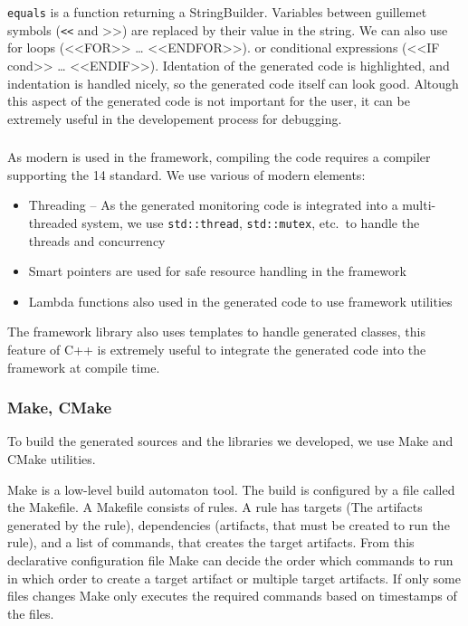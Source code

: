 \texttt{equals} is a function returning a StringBuilder.
Variables between guillemet symbols (\texttt{<<} and >>) are replaced by their value in the string. 
We can also use for loops (<<FOR>> \dots{} <<ENDFOR>>). or conditional expressions (<<IF cond>> \dots{} <<ENDIF>>).
Identation of the generated code is highlighted, and indentation is handled nicely, so the generated code itself can look good. 
Altough this aspect of the generated code is not important for the user, it can be extremely useful in the developement process for debugging. 




\subsubsection{\protect\cpptt }

As modern \cpp{} is used in the framework, compiling the code requires a compiler supporting the \cpp{}14 standard.
We use various of modern \cpp{} elements:
\begin{itemize}
	\item Threading -- As the generated monitoring code is integrated into a multi-threaded system, we use \texttt{std::thread}, \texttt{std::mutex}, etc.\ to handle the threads and concurrency
	\item Smart pointers are used for safe resource handling in the framework
	\item Lambda functions also used in the generated code to use framework utilities
\end{itemize}
The framework library also uses \cpp{} templates to handle generated classes, this feature of C++ is extremely useful to integrate the generated code into the framework at compile time.

\subsubsection{ Make, CMake }

To build the generated sources and the \cpp{} libraries we developed, we use Make and CMake utilities. 


Make is a low-level build automaton tool. 
The build is configured by a file called the Makefile.
A Makefile consists of rules. 
A rule has targets (The artifacts generated by the rule), dependencies (artifacts, that must be created to run the rule), and a list of commands, that creates the target artifacts. 
From this declarative configuration file Make can decide the order which commands to run in which order to create a target artifact or multiple target artifacts.
If only some files changes Make only executes the required commands based on timestamps of the files.

